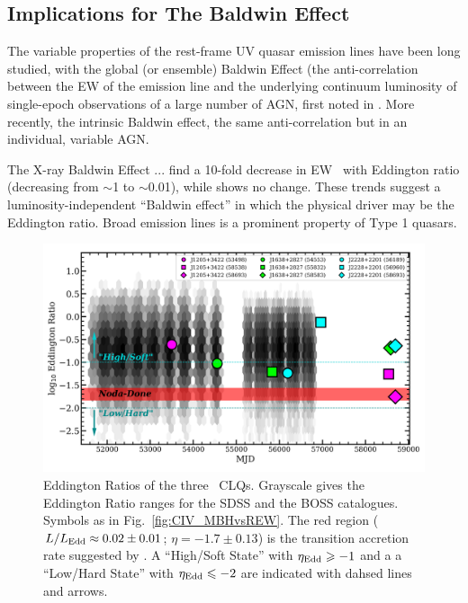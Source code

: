 \documentclass[fleqn,usenatbib]{mnras}
\begin{document}
\subsection{Implications for The Baldwin Effect}
The variable properties of the rest-frame UV quasar emission lines have been long studied, with the global (or ensemble) Baldwin Effect (the anti-correlation between the EW of the emission line and the underlying continuum luminosity of single-epoch observations of a large number of AGN, first noted in \citet{Baldwin1977}.  More recently, the intrinsic Baldwin effect, the same anti-correlation but in an individual, variable AGN.  

The X-ray Baldwin Effect \citep[e.g., ][]{Iwasawa_Taniguchi1993}... \citet{Bachev2004} find a 10-fold decrease in EW \civ\ with Eddington ratio (decreasing from $\sim$1 to $\sim$0.01), while \nv shows no change. These trends suggest a luminosity-independent ``Baldwin effect'' in which the physical driver may be the Eddington ratio. \citet{Ge2016} Broad emission lines is a prominent property of Type 1 quasars. 



\begin{figure}
  \centering
  \includegraphics[width=14.5cm, trim=0.2cm 0.2cm 0.0cm 0.2cm, clip]
  {figures/MJD_vs_Eddington_20191202.png}
  \vspace{-12pt}
  \caption[]{Eddington Ratios of the three \civ\ CLQs.
    Grayscale gives the Eddington Ratio ranges for the SDSS
    \citep[from ][]{Shen2011} and the BOSS \citep[from ][]{Kozlowski2017)} 
    catalogues.
    Symbols as in Fig.~\ref{fig:CIV_MBHvsREW}.
    The red region ($L / L_{\rm Edd} \approx 0.02\pm0.01$;  $\eta =-1.7\pm0.13$) is
    the transition accretion rate suggested by \citet{NodaDone2018}.
    A ``High/Soft State'' with $\eta_{\rm Edd} \geq -1$ and a
    a ``Low/Hard State'' with $\eta_{\rm Edd} \leq -2$ are indicated 
    with dahsed lines and arrows. 
  }
  \label{fig:Eddington_ratios}
\end{figure}
\end{document}
